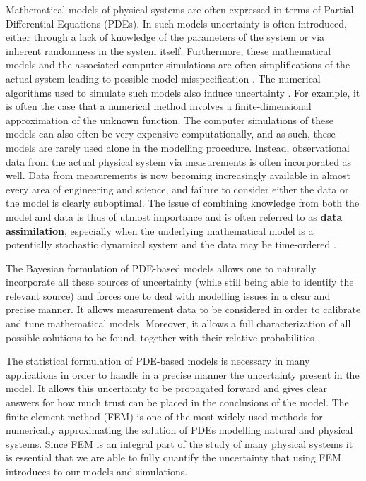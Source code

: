 
Mathematical models of physical systems are often expressed in terms of Partial Differential Equations (PDEs). In such models uncertainty is often introduced, either through a lack of knowledge of the parameters of the system or via inherent randomness in the system itself. Furthermore, these mathematical models and the associated computer simulations are often simplifications of the actual system leading to possible model misspecification \textcolor{blue}{\cite{girolami2019statistical}}. The numerical algorithms used to simulate such models also induce uncertainty \textcolor{blue}{\cite{conrad2017statistical}}. For example, it is often the case that a numerical method involves a finite-dimensional approximation of the unknown function. The computer simulations of these models can also often be very expensive computationally, and as such, these models are rarely used alone in the modelling procedure. Instead, observational data from the actual physical system via measurements is often incorporated as well. Data from measurements is now becoming increasingly available in almost every area of engineering and science, and failure to consider either the data or the model is clearly suboptimal. The issue of combining knowledge from both the model and data is thus of utmost importance and is often referred to as \textbf{data assimilation}, especially when the underlying mathematical model is a potentially stochastic dynamical system and the data may be time-ordered \textcolor{blue}{\cite{law2015data}}.

The Bayesian formulation of PDE-based models allows one to naturally incorporate all these sources of uncertainty (while still being able to identify the relevant source) and forces one to deal with modelling issues in a clear and precise manner. It allows measurement data to be considered in order to calibrate and tune mathematical models. Moreover, it allows a full characterization of all possible solutions to be found, together with their relative probabilities \textcolor{blue}{\cite{stuart2010inverse}}.

The statistical formulation of PDE-based models is necessary in many applications in order to handle in a precise manner the uncertainty present in the model. It allows this uncertainty to be propagated forward and gives clear answers for how much trust can be placed in the conclusions of the model. The finite element method (FEM) \textcolor{blue}{\cite{strang1973analysis}} is one of the most widely used methods for numerically approximating the solution of PDEs modelling natural and physical systems. Since FEM is an integral part of the study of many physical systems it is essential that we are able to fully quantify the uncertainty that using FEM introduces to our models and simulations.


